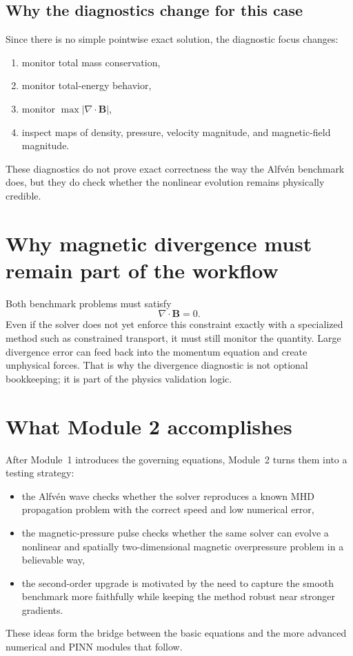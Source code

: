 \documentclass[11pt]{article}
\newcommand{\Bvec}{\mathbf{B}}
\begin{document}
\subsection{Why the diagnostics change for this case}
Since there is no simple pointwise exact solution, the diagnostic focus changes:
\begin{enumerate}[leftmargin=1.8em]
    \item monitor total mass conservation,
    \item monitor total-energy behavior,
    \item monitor $\max |\nabla\cdot\Bvec|$,
    \item inspect maps of density, pressure, velocity magnitude, and magnetic-field magnitude.
\end{enumerate}
These diagnostics do not prove exact correctness the way the Alfv\'en benchmark does, but they do check whether the nonlinear evolution remains physically credible.

\section{Why magnetic divergence must remain part of the workflow}
Both benchmark problems must satisfy
\begin{equation}
\nabla\cdot\Bvec = 0.
\label{eq:m2-divb}
\end{equation}
Even if the solver does not yet enforce this constraint exactly with a specialized method such as constrained transport, it must still monitor the quantity. Large divergence error can feed back into the momentum equation and create unphysical forces. That is why the divergence diagnostic is not optional bookkeeping; it is part of the physics validation logic.

\section{What Module 2 accomplishes}
After Module~1 introduces the governing equations, Module~2 turns them into a testing strategy:
\begin{itemize}[leftmargin=1.8em]
    \item the Alfv\'en wave checks whether the solver reproduces a known MHD propagation problem with the correct speed and low numerical error,
    \item the magnetic-pressure pulse checks whether the same solver can evolve a nonlinear and spatially two-dimensional magnetic overpressure problem in a believable way,
    \item the second-order upgrade is motivated by the need to capture the smooth benchmark more faithfully while keeping the method robust near stronger gradients.
\end{itemize}
These ideas form the bridge between the basic equations and the more advanced numerical and PINN modules that follow.
\end{document}
